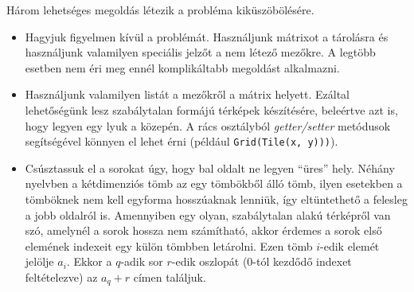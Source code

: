 Három lehetséges megoldás létezik a probléma kiküszöbölésére.
\begin{itemize}
\item Hagyjuk figyelmen kívül a problémát. Használjunk mátrixot a tárolásra és használjunk valamilyen speciális jelzőt a nem létező mezőkre. A legtöbb esetben nem éri meg ennél komplikáltabb megoldást alkalmazni.
\item Használjunk valamilyen listát a mezőkről a mátrix helyett. Ezáltal lehetőségünk lesz szabálytalan formájú térképek készítésére, beleértve azt is, hogy legyen egy lyuk a közepén. A rács osztályból \textit{getter/setter} metódusok segítségével könnyen el lehet érni (például \texttt{Grid(Tile(x, y)))}).
\item Csúsztassuk el a sorokat úgy, hogy bal oldalt ne legyen “üres” hely. Néhány nyelvben a kétdimenziós tömb az egy tömbökből álló tömb, ilyen esetekben a tömböknek nem kell egyforma hosszúaknak lenniük, így eltüntethető a felesleg a jobb oldalról is. Amennyiben egy olyan, szabálytalan alakú térképről van szó, amelynél a sorok hossza nem számítható, akkor érdemes a sorok első elemének indexeit egy külön tömbben letárolni. Ezen tömb $i$-edik elemét jelölje $a_i$. Ekkor a $q$-adik sor $r$-edik oszlopát ($0$-tól kezdődő indexet feltételezve) az $a_q + r$ címen találjuk.
\end{itemize}

